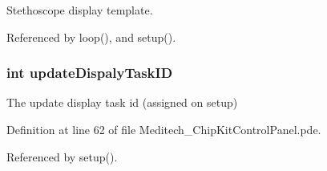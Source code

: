 Stethoscope display template. 



Referenced by loop(), and setup().

\hypertarget{_meditech___chip_kit_control_panel_8pde_a527a89c41abb1d8660b53f5e727e655c}{
\subsubsection[{update\-Dispaly\-Task\-I\-D}]{\setlength{\rightskip}{0pt plus 5cm}int update\-Dispaly\-Task\-I\-D}}\label{_meditech___chip_kit_control_panel_8pde_a527a89c41abb1d8660b53f5e727e655c}


The update display task id (assigned on setup) 



Definition at line 62 of file Meditech\-\_\-\-Chip\-Kit\-Control\-Panel.\-pde.



Referenced by setup().

